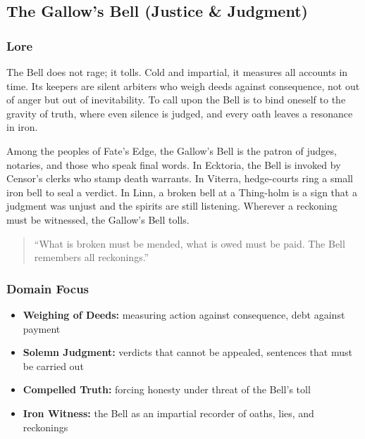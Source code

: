 
\subsection{The Gallow's Bell (Justice \& Judgment)}

\subsubsection*{Lore}
The Bell does not rage; it tolls. Cold and impartial, it measures all accounts in time. Its keepers are silent arbiters who weigh deeds against consequence, not out of anger but out of inevitability. To call upon the Bell is to bind oneself to the gravity of truth, where even silence is judged, and every oath leaves a resonance in iron.

Among the peoples of Fate's Edge, the Gallow's Bell is the patron of judges, notaries, and those who speak final words. In Ecktoria, the Bell is invoked by Censor's clerks who stamp death warrants. In Viterra, hedge-courts ring a small iron bell to seal a verdict. In Linn, a broken bell at a Thing-holm is a sign that a judgment was unjust and the spirits are still listening. Wherever a reckoning must be witnessed, the Gallow's Bell tolls.

\begin{quote}
``What is broken must be mended, what is owed must be paid. The Bell remembers all reckonings.''
\end{quote}

\subsubsection*{Domain Focus}
\begin{itemize}
  \item \textbf{Weighing of Deeds:} measuring action against consequence, debt against payment
  \item \textbf{Solemn Judgment:} verdicts that cannot be appealed, sentences that must be carried out
  \item \textbf{Compelled Truth:} forcing honesty under threat of the Bell's toll
  \item \textbf{Iron Witness:} the Bell as an impartial recorder of oaths, lies, and reckonings
\end{itemize}

